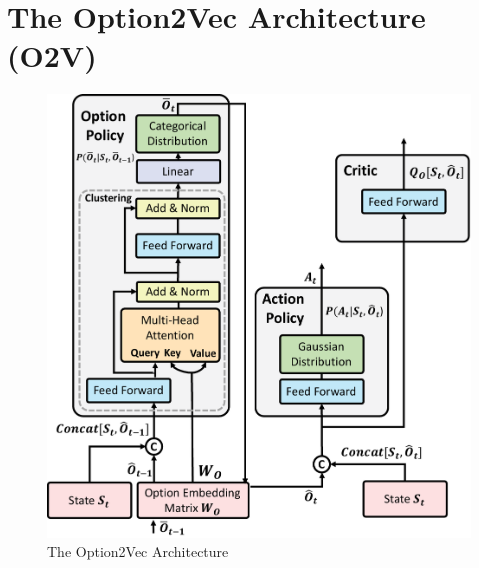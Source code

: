 \documentclass[10pt,journal,compsoc]{IEEEtran}
\begin{document}
\section{The Option2Vec Architecture (O2V)}
\label{sec:net_arch}
\begin{figure}
  \includegraphics[width=1\linewidth]{./figures/sa_attn_net}
  \caption{\label{fig:sa_net} The Option2Vec Architecture}
\end{figure}
\end{document}
